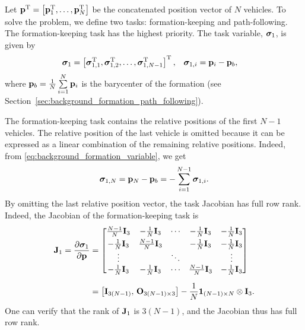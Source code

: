 Let $\mathbf{p}^{\mathrm{T}} = \left[\mathbf{p}_1^{\mathrm{T}}, \ldots, \mathbf{p}_N^{\mathrm{T}}\right]$ be the concatenated position vector of $N$ vehicles.
To solve the problem, we define two tasks: formation-keeping and path-following.
The formation-keeping task has the highest priority.
The task variable, $\bm{\sigma}_1$, is given by
\begin{align}
    \bm{\sigma}_1 &= \left[\bm{\sigma}_{1, 1}^{\mathrm{T}}, \bm{\sigma}_{1, 2}^{\mathrm{T}}, \ldots, \bm{\sigma}_{1, N-1}^{\mathrm{T}}\right]^{\mathrm{T}}, &
    \bm{\sigma}_{1, i} &= \mathbf{p}_i - \mathbf{p}_b,
    \label{eq:background_formation_variable}
\end{align}
where $\mathbf{p}_b = \frac{1}{N}\sum\limits_{i=1}^N \mathbf{p}_i$ is the barycenter of the formation (see Section~\ref{sec:background_formation_path_following}).

\begin{rmk}
    The formation-keeping task contains the relative positions of the first $N-1$ vehicles.
    The relative position of the last vehicle is omitted because it can be expressed as a linear combination of the remaining relative positions.
    Indeed, from \eqref{eq:background_formation_variable}, we get
    \begin{equation}
        \bm{\sigma}_{1, N} = \mathbf{p}_N - \mathbf{p}_b = - \sum_{i=1}^{N-1} \bm{\sigma}_{1, i}.
    \end{equation}
    By omitting the last relative position vector, the task Jacobian has full row rank.
    Indeed, the Jacobian of the formation-keeping task is
    \begin{equation}
        \begin{split}
            \mathbf{J}_1 = \frac{\partial \bm{\sigma}_1}{\partial \mathbf{p}} &= 
            \begin{bmatrix}
                \frac{N-1}{N} \mathbf{I}_3 & -\frac{1}{N} \mathbf{I}_3 & \cdots & -\frac{1}{N} \mathbf{I}_3 & -\frac{1}{N} \mathbf{I}_3 \\[3pt]
                -\frac{1}{N} \mathbf{I}_3 & \frac{N-1}{N} \mathbf{I}_3 & & -\frac{1}{N} \mathbf{I}_3 & -\frac{1}{N} \mathbf{I}_3 \\ 
                \vdots & & \ddots & & \vdots \\
                -\frac{1}{N} \mathbf{I}_3 & -\frac{1}{N} \mathbf{I}_3 & \cdots & \frac{N-1}{N} \mathbf{I}_3 & -\frac{1}{N} \mathbf{I}_3
            \end{bmatrix} \\[6pt]
            &= \left[\mathbf{I}_{3(N-1)},\, \mathbf{O}_{3(N-1) \times 3}\right] - \frac{1}{N} \mathbf{1}_{(N-1) \times N} \otimes \mathbf{I}_3.
        \end{split}
        \label{eq:background_NSB_formation_jacobian}
    \end{equation}
    One can verify that the rank of $\mathbf{J}_1$ is $3(N-1)$, and the Jacobian thus has full row rank.
\end{rmk}

